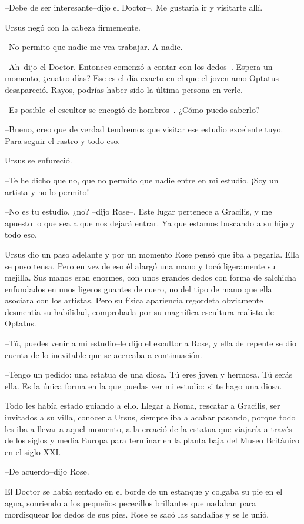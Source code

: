 --Debe de ser interesante--dijo el Doctor--. Me gustaría ir y visitarte
allí.

Ursus negó con la cabeza firmemente.

--No permito que nadie me vea trabajar. A nadie.

--Ah--dijo el Doctor. Entonces comenzó a contar con los dedos--. Espera
un momento, ¿cuatro días? Ese es el día exacto en el que el joven amo
Optatus desapareció. Rayos, podrías haber sido la última persona en
verle.

--Es posible--el escultor se encogió de hombros--. ¿Cómo puedo saberlo?

--Bueno, creo que de verdad tendremos que visitar ese estudio excelente
tuyo. Para seguir el rastro y todo eso.

Ursus se enfureció.

--Te he dicho que no, que no permito que nadie entre en mi estudio. ¡Soy
un artista y no lo permito!

--No es tu estudio, ¿no? --dijo Rose--. Este lugar pertenece a Gracilis,
y me apuesto lo que sea a que nos dejará entrar. Ya que estamos buscando
a su hijo y todo eso.

Ursus dio un paso adelante y por un momento Rose pensó que iba a
pegarla. Ella se puso tensa. Pero en vez de eso él alargó una mano y
tocó ligeramente su mejilla. Sus manos eran enormes, con unos grandes
dedos con forma de salchicha enfundados en unos ligeros guantes de
cuero, no del tipo de mano que ella asociara con los artistas. Pero su
física apariencia regordeta obviamente desmentía su habilidad,
comprobada por su magnífica escultura realista de Optatus.

--Tú, puedes venir a mi estudio--le dijo el escultor a Rose, y ella de
repente se dio cuenta de lo inevitable que se acercaba a continuación.

--Tengo un pedido: una estatua de una diosa. Tú eres joven y hermosa. Tú
serás ella. Es la única forma en la que puedas ver mi estudio: si te
hago una diosa.

Todo les había estado guiando a ello. Llegar a Roma, rescatar a
Gracilis, ser invitados a su villa, conocer a Ursus, siempre iba a
acabar pasando, porque todo les iba a llevar a aquel momento, a la
creació de la estatua que viajaría a través de los siglos y media Europa
para terminar en la planta baja del Museo Británico en el siglo XXI.

--De acuerdo--dijo Rose.

El Doctor se había sentado en el borde de un estanque y colgaba su pie
en el agua, sonriendo a los pequeños pececillos brillantes que nadaban
para mordisquear los dedos de sus pies. Rose se sacó las sandalias y se
le unió.

